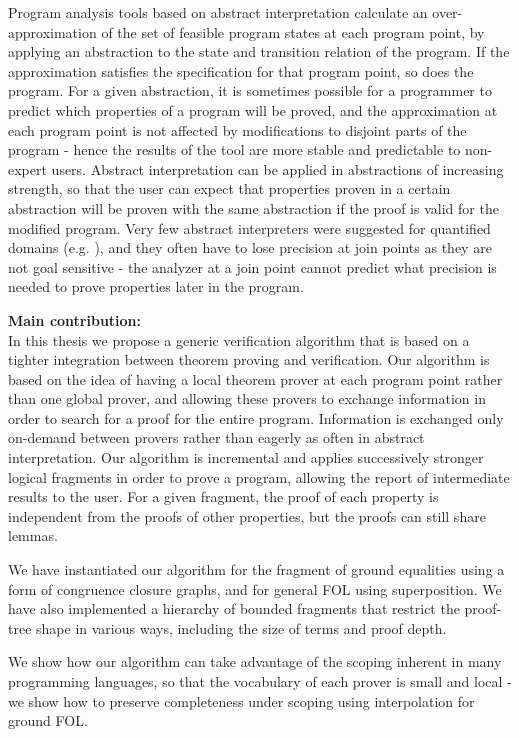 Program analysis tools based on abstract interpretation calculate an over-approximation of the set of feasible program states at each program point, by applying an abstraction to the state and transition relation of the program.
If the approximation satisfies the specification for that program point, so does the program.
For a given abstraction, it is sometimes possible for a programmer to predict which properties of a program will be proved, and the approximation at each program point is not affected by modifications to disjoint parts of the program - hence the results of the tool are more stable and predictable to non-expert users. Abstract interpretation can be applied in abstractions of increasing strength, so that the user can expect that properties proven in a certain abstraction will be proven with the same abstraction if the proof is valid for the modified program.
Very few abstract interpreters were suggested for quantified domains (e.g. \cite{DBLP:conf/popl/GulwaniMT08}),
and they often have to lose precision at join points as they are not goal sensitive - the analyzer at a join point cannot predict what precision is needed to prove properties later in the program.

\textbf{Main contribution:}\\
In this thesis we propose a generic verification algorithm that is based on a tighter integration between theorem proving and verification. 
Our algorithm is based on the idea of having a local theorem prover at each program point rather than one global prover, and allowing these provers to exchange information in order to search for a proof for the entire program. Information is exchanged only on-demand between provers rather than eagerly as often in abstract interpretation.
Our algorithm is incremental and applies successively stronger logical fragments in order to prove a program, allowing the report of intermediate results to the user. For a given fragment, the proof of each property is independent from the proofs of other properties, but the proofs can still share lemmas. 

We have instantiated our algorithm for the fragment of ground equalities using a form of congruence closure graphs, and for general FOL using superposition. We have also implemented a hierarchy of bounded fragments that restrict the proof-tree shape in various ways, including the size of terms and proof depth.

We show how our algorithm can take advantage of the scoping inherent in many programming languages, 
so that the vocabulary of each prover is small and local - we show how to preserve completeness under scoping using interpolation for ground FOL.

